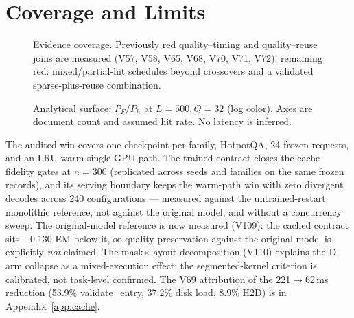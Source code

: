 \section{Coverage and Limits}
\label{sec:coverage}

\begin{figure}[H]
\centering
\caption{Evidence coverage. Previously red quality--timing and
quality--reuse joins are measured (V57, V58, V65, V68, V70, V71, V72);
remaining red: mixed/partial-hit schedules beyond crossovers and a
validated sparse-plus-reuse combination.}
\label{fig:coverage}
\end{figure}

\begin{figure}[H]
\centering\resizebox{.88\linewidth}{!}{}
\caption{Analytical surface: $P_F/P_h$ at $L{=}500,Q{=}32$ (log color).
Axes are document count and assumed hit rate. No latency is inferred.}
\label{fig:surface}
\end{figure}

The audited win covers one checkpoint per family, HotpotQA, 24 frozen
requests, and an LRU-warm single-GPU path. The trained contract closes the
cache-fidelity gates at $n{=}300$ (replicated across seeds and families on
the same frozen records), and its serving boundary keeps the warm-path win
with zero divergent decodes across 240 configurations --- measured against
the untrained-restart monolithic reference, not against the original model,
and without a concurrency sweep. The original-model reference is now
measured (V109): the cached contract sits $-0.130$ EM below it, so
quality preservation against the original model is explicitly \emph{not}
claimed. The mask$\times$layout decomposition (V110) explains the D-arm
collapse as a mixed-execution effect; the segmented-kernel criterion is
calibrated, not task-level confirmed. The V69 attribution of the
221$\to$62\,ms reduction (53.9\% validate\_entry, 37.2\% disk load, 8.9\%
H2D) is in Appendix~\ref{app:cache}.

